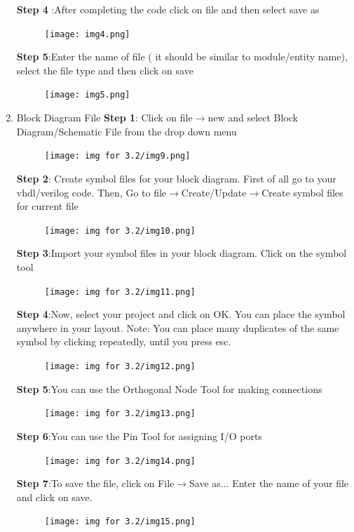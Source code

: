 \documentclass[12pt,singleside,a4paper]{article}
\begin{document}
\begin{enumerate}
\newpage
\noindent \textbf{Step 4} :After completing the code click on file and then select save as
\begin{figure}[H]
\centering
\texttt{[image: img4.png]}
\end{figure}
\noindent \textbf{Step 5}:Enter the name of file ( it should be similar to module/entity name), select the file type and then click on save
\begin{figure}[H]
\centering
\texttt{[image: img5.png]}
\end{figure}
\newpage
\item Block Diagram File
\newline
\newline
\textbf{Step 1}: Click on file$\rightarrow$new and select Block Diagram/Schematic File from the drop down menu
\begin{figure}[H]
\centering
\texttt{[image: img for 3.2/img9.png]}
\end{figure}
\noindent \textbf{Step 2}: Create symbol files for your block diagram. First of all go to your vhdl/verilog code. Then, Go to file$\rightarrow$Create/Update$\rightarrow$Create symbol files for current file
\begin{figure}[H]
\centering
\texttt{[image: img for 3.2/img10.png]}
\end{figure}
\noindent \textbf{Step 3}:Import your symbol files in your block diagram. Click on the symbol tool
\begin{figure}[H]
\centering
\texttt{[image: img for 3.2/img11.png]}
\end{figure}
\noindent \textbf{Step 4}:Now, select your project and click on OK. You can place the symbol anywhere in your layout.
Note: You can place many duplicates of the same symbol by clicking repeatedly, until you press esc.
\begin{figure}[H]
\centering
\texttt{[image: img for 3.2/img12.png]}
\end{figure}
\noindent \textbf{ Step 5}:You can use the Orthogonal Node Tool for making connections
\begin{figure}[H]
\centering
\texttt{[image: img for 3.2/img13.png]}
\end{figure}
\noindent \textbf{Step 6}:You can use the Pin Tool for assigning I/O ports
\begin{figure}[H]
\centering
\texttt{[image: img for 3.2/img14.png]}
\end{figure}
\noindent \textbf{Step 7}:To save the file, click on File$\rightarrow$Save as... Enter the name of your file and click on save.
\begin{figure}[H]
\centering
\texttt{[image: img for 3.2/img15.png]}
\end{figure}
\end{enumerate}
\end{document}
